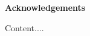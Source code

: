 \thispagestyle{plain}
\begin{flushleft}
    \Huge
    \textbf{Acknowledgements}    
\end{flushleft}
\vspace{1cm}
Content....